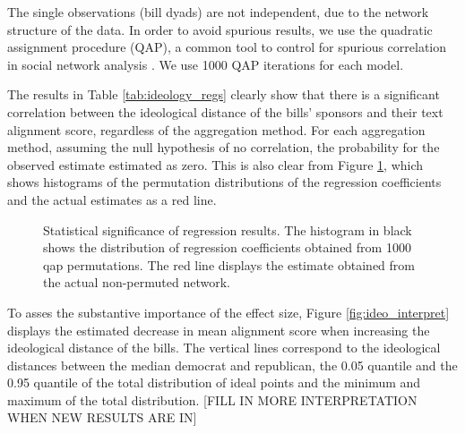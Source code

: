\documentclass[12pt]{article} %
\begin{document}
The single observations (bill dyads) are not independent, due to the network structure of the data. In order to avoid spurious results, we use the quadratic assignment procedure (QAP), a common tool to control for spurious correlation in social network analysis \citet{krackardt1987qap}. We use 1000 QAP iterations for each model.



The results in Table \ref{tab:ideology_regs} clearly show that there is a significant correlation between the ideological distance of the bills' sponsors and their text alignment score, regardless of the aggregation method. For each aggregation method, assuming the null hypothesis of no correlation, the probability for the observed estimate estimated as zero. This is also clear from Figure \ref{fig:qap_dist}, which shows histograms of the permutation distributions of the regression coefficients and the actual estimates as a red line. 

\begin{figure}[ht!]
\caption{Statistical significance of regression results. The histogram in black shows the distribution of regression coefficients obtained from 1000 qap permutations. The red line displays the estimate obtained from the actual non-permuted network.}
\label{fig:qap_dist}
\end{figure}

To asses the substantive importance of the effect size, Figure \ref{fig:ideo_interpret} displays the estimated decrease in mean alignment score when increasing the ideological distance of the bills. The vertical lines correspond to the ideological distances between the median democrat and republican, the 0.05 quantile and the 0.95 quantile of the total distribution of ideal points and the minimum and maximum of the total distribution. [FILL IN MORE INTERPRETATION WHEN NEW RESULTS ARE IN] 
\end{document}
